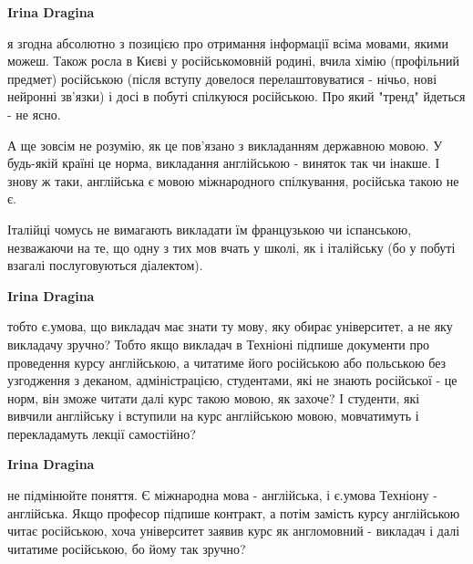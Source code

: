 \begin{itemize}
\begin{itemize}
\textbf{Irina Dragina} 

я згодна абсолютно з позицією про отримання інформації всіма мовами, якими
можеш. Також росла в Києві у російськомовній родині, вчила хімію (профільний
предмет) російською (після вступу довелося перелаштовуватися - нічьо, нові
нейронні зв'язки) і досі в побуті спілкуюся російською. Про який "тренд"
йдеться - не ясно.

А ще зовсім не розумію, як це пов'язано з викладанням державною мовою. У
будь-якій країні це норма, викладання англійською - виняток так чи інакше. І
знову ж таки, англійська є мовою міжнародного спілкування, російська такою не
є.

Італійці чомусь не вимагають викладати їм французькою чи іспанською, незважаючи
на те, що одну з тих мов вчать у школі, як і італійську (бо у побуті взагалі
послуговуються діалектом).

 
\textbf{Irina Dragina} 

тобто є.умова, що викладач має знати ту мову, яку обирає університет, а не яку
викладачу зручно? Тобто якщо викладач в Техніоні підпише документи про
проведення курсу англійською, а читатиме його російською або польською без
узгодження з деканом, адміністрацією, студентами, які не знають російської - це
норм, він зможе читати далі курс такою мовою, як захоче? І студенти, які
вивчили англійську і вступили на курс англійською мовою, мовчатимуть і
перекладамуть лекції самостійно?


 
\textbf{Irina Dragina} 

не підмінюйте поняття. Є міжнародна мова - англійська, і є.умова Техніону -
англійська. Якщо професор підпише контракт, а потім замість курсу англійською
читає російською, хоча університет заявив курс як англомовний - викладач і далі
читатиме російською, бо йому так зручно?

 

\end{itemize}
\end{itemize}
